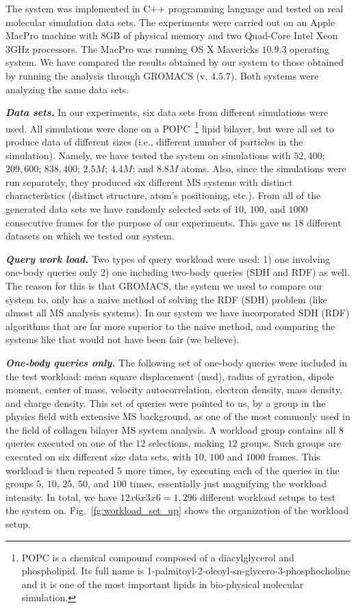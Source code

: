 \documentclass[10pt,journal,final,letterpaper,twocolumn]{IEEEtran}
\begin{document}
The system was implemented in C++ programming language and tested on
real molecular simulation data sets. The experiments were carried
out on an Apple MacPro machine with 8GB of physical memory and two
Quad-Core Intel Xeon 3GHz processors. The MacPro was running OS X
Mavericks $10.9.3$ operating system. We have compared the results
obtained by our system to those obtained by running the analysis
through GROMACS (v. $4.5.7$). Both systems were analyzing the same
data sets.

\emph{\textbf{Data sets.}} In our experiments, six data sets from
different simulations were used. All simulations were done on a
POPC~\footnote{POPC is a chemical compound composed of a
diacylglycerol and phospholipid. Its full name is
1-palmitoyl-2-oleoyl-sn-glycero-3-phosphocholine and it is one of
the most important lipids in bio-physical molecular simulation.}
lipid bilayer, but were all set to produce data of different sizes
(i.e., different number of particles in the simulation). Namely, we
have tested the system on simulations with $52,400$; $209,600$;
$838,400$; $2.5M$; $4.4M$; and $8.8M$ atoms. Also, since the
simulations were run separately, they produced six different MS
systems with distinct characteristics (distinct structure, atom's
positioning, etc.). From all of the generated data sets we have
randomly selected sets of $10$, $100$, and $1000$ consecutive frames
for the purpose of our experiments. This gave us $18$ different
datasets on which we tested our system.

\emph{\textbf{Query work load.}} Two types of query workload were
used: 1) one involving one-body queries only 2) one including
two-body queries (SDH and RDF) as well. The reason for this is that
GROMACS, the system we used to compare our system to, only has a
naive method of solving the RDF (SDH) problem (like almost all MS
analysis systems). In our system we have incorporated SDH (RDF)
algorithms that are far more superior to the naive method, and
comparing the systems like that would not have been fair (we
believe).

\emph{\textbf{One-body queries only.}} The following set of one-body
queries were included in the test workload: mean square displacement
(msd), radius of gyration, dipole moment, center of mass, velocity
autocorrelation, electron density, mass density, and charge density.
This set of queries were pointed to us, by a group in the physics
field with extensive MS background, as one of the most commonly used
in the field of collagen bilayer MS system analysis. A workload
group contains all $8$ queries executed on one of the $12$
selections, making $12$ groups. Such groups are executed on six
different size data sets, with $10$, $100$ and $1000$ frames. This
workload is then repeated $5$ more times, by executing each of the
queries in the groups $5$, $10$, $25$, $50$, and $100$ times,
essentially just magnifying the workload intensity. In total, we
have $12 x 6 x 3 x 6 = 1,296$ different workload setups to test the
system on. Fig.~\ref{fg:workload_set_up} shows the organization of
the workload setup.
\end{document}
